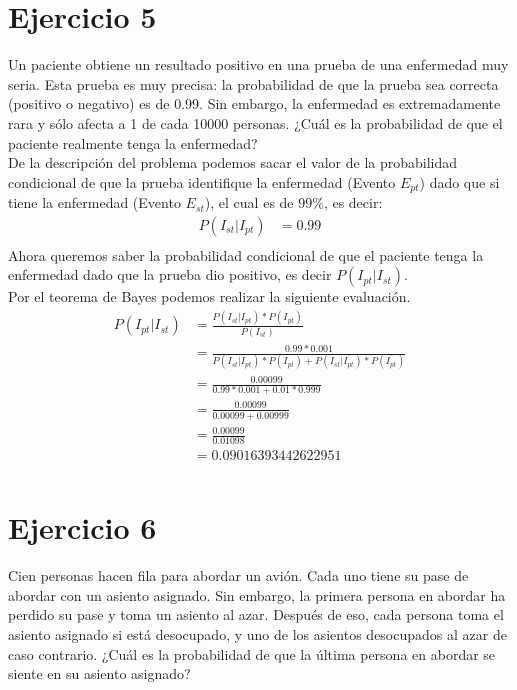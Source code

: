 \documentclass[12pt]{article}
\begin{document}
\section{Ejercicio 5}
Un paciente obtiene un resultado positivo en una prueba de una enfermedad muy seria. Esta
prueba es muy precisa: la probabilidad de que la prueba sea correcta (positivo o negativo) es
de 0.99. Sin embargo, la enfermedad es extremadamente rara y sólo afecta a 1 de cada 10000
personas. ¿Cuál es la probabilidad de que el paciente realmente tenga la enfermedad?\\
De la descripción del problema podemos sacar el valor de la probabilidad condicional de que la prueba identifique la enfermedad (Evento $E_{pt}$) dado que si tiene la enfermedad (Evento $E_{st}$), el cual es de 99\%, es decir:
\begin{equation}
\begin{split}
P(I_{st} | I_{pt}) &=0.99\\ 
\end{split}
\end{equation}
Ahora queremos saber la probabilidad condicional de que el paciente tenga la enfermedad dado que la prueba dio positivo, es decir $P(I_{pt} | I_{st})$.\\
Por el teorema de Bayes podemos realizar la siguiente evaluación.
\begin{equation}
\begin{split}
P(I_{pt} | I_{st}) &=\frac{P(I_{st} | I_{pt}) * P(I_{pt})}{P(I_{st})}\\
&=\frac{0.99 * 0.001}{P(I_{st} | I_{pt}) * P(I_{pt}) + P(I_{st} | \overline{I_{pt}}) * P(\overline{I_{pt}})}\\ 
&=\frac{0.00099}{0.99 * 0.001 + 0.01 * 0.999}\\
&=\frac{0.00099}{0.00099 + 0.00999}\\
&=\frac{0.00099}{0.01098}\\
&=0.09016393442622951\\
\end{split}
\end{equation}
\section{Ejercicio 6}
Cien personas hacen fila para abordar un avión. Cada uno tiene su pase de abordar con un
asiento asignado. Sin embargo, la primera persona en abordar ha perdido su pase y toma un
asiento al azar. Después de eso, cada persona toma el asiento asignado si está desocupado, y
uno de los asientos desocupados al azar de caso contrario. ¿Cuál es la probabilidad de que la
última persona en abordar se siente en su asiento asignado?\\
\end{document}
